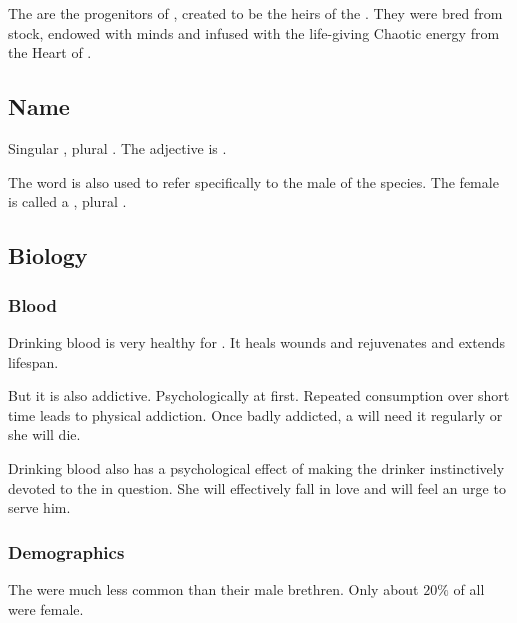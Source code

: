 \section{\Resphan}
The \resphain{} are the progenitors of \humans{}, created to be the heirs of the \SitraAchra. 
They were bred from \nephilic{} stock, endowed with \erebean{} minds and infused with the life-giving Chaotic energy from the Heart of \Miith. 









\subsection{Name}
Singular \emph{\resphan{}}, plural \emph{\resphain{}}. The adjective is \emph{\resphan{}}. 

The word \quo{\resphan} is also used to refer specifically to the male of the species. The female is called a \resvil, plural \resviel. 









\subsection{Biology}





\subsubsection{Blood}
Drinking \resphan blood is very healthy for \humans.
It heals wounds and rejuvenates and extends lifespan.

But it is also addictive.
Psychologically at first.
Repeated consumption over short time leads to physical addiction.
Once badly addicted, a \human will need it regularly or she will die.

Drinking \resphan blood also has a psychological effect of making the drinker instinctively devoted to the \resphan in question.
She will effectively fall in love and will feel an urge to serve him.





\subsubsection{Demographics}
The \resviel were much less common than their male brethren. 
Only about $20\%$ of all \resphain were female. 





